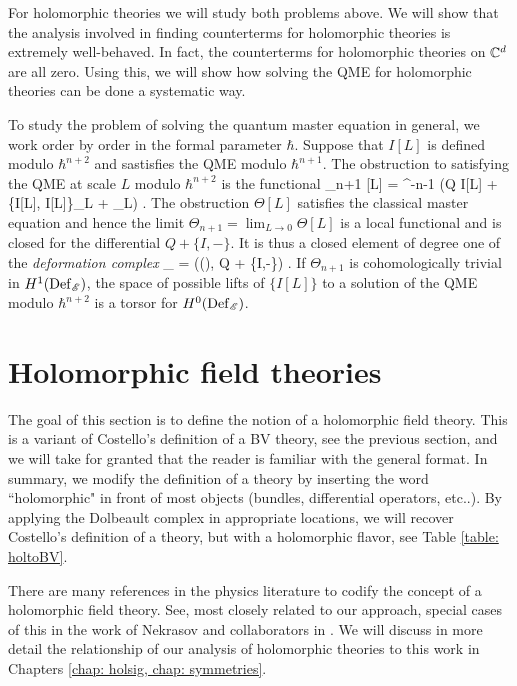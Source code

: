 For holomorphic theories we will study both problems above.
We will show that the analysis involved in finding counterterms for holomorphic theories is extremely well-behaved. 
In fact, the counterterms for holomorphic theories on $\mathbb C^d$ are all zero.
Using this, we will show how solving the QME for holomorphic theories can be done a systematic way.

To study the problem of solving the quantum master equation in general, we work order by order in the formal parameter $\hbar$.
Suppose that $I[L]$ is defined modulo $\hbar^{n+2}$ and sastisfies the QME modulo $\hbar^{n+1}$.
The obstruction to satisfying the QME at scale $L$ modulo $\hbar^{n+2}$ is the functional
\ben
\Theta_{n+1} [L] = \hbar^{-n-1} (Q I[L] + \{I[L], I[L]\}_L + \hbar \Delta_L) .
\een
The obstruction $\Theta[L]$ satisfies the classical master equation and hence the limit $\Theta_{n+1} = \lim_{L \to 0} \Theta[L]$ is a local functional and is closed for the differential $Q + \{I, -\}$. 
It is thus a closed element of degree one of the {\em deformation complex}
\ben
\Def_{\sE} = \left(\oloc(\sE), Q + \{I,-\}\right) .
\een
If $\Theta_{n+1}$ is cohomologically trivial in $H^1({\rm Def}_{\mathscr E})$, the space of possible lifts of $\{I[L]\}$ to a solution of the QME modulo $\hbar^{n+2}$ is a torsor for $H^0({\rm Def}_{\mathscr E})$. 


\section{Holomorphic field theories} \label{sec: hol theory}

The goal of this section is to define the notion of a holomorphic field theory. 
This is a variant of Costello's definition of a BV theory, see the previous section, and we will take for granted that the reader is familiar with the general format.
In summary, we modify the definition of a theory by inserting the word ``holomorphic" in front of most objects (bundles, differential operators, etc..).
By applying the Dolbeault complex in appropriate locations, we will recover Costello's definition of a theory, but with a holomorphic flavor, see Table \ref{table: holtoBV}. 

There are many references in the physics literature to codify the concept of a holomorphic field theory.
See, most closely related to our approach, special cases of this in the work of Nekrasov and collaborators in \cite{NekThesis, NekChiral, NekCFT}. 
We will discuss in more detail the relationship of our analysis of holomorphic theories to this work in Chapters \ref{chap: holsig, chap: symmetries}. 

